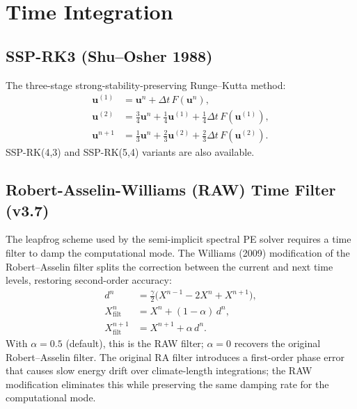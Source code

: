 \documentclass[11pt,a4paper]{article}
\begin{document}
\section{Time Integration}

\subsection{SSP-RK3 (Shu--Osher 1988)}

The three-stage strong-stability-preserving Runge--Kutta method:
\begin{align}
  \bm u^{(1)} &= \bm u^n + \Delta t\,F(\bm u^n), \\
  \bm u^{(2)} &= \tfrac{3}{4}\bm u^n + \tfrac{1}{4}\bm u^{(1)} + \tfrac{1}{4}\Delta t\,F(\bm u^{(1)}), \\
  \bm u^{n+1} &= \tfrac{1}{3}\bm u^n + \tfrac{2}{3}\bm u^{(2)} + \tfrac{2}{3}\Delta t\,F(\bm u^{(2)}).
\end{align}
SSP-RK(4,3) and SSP-RK(5,4) variants are also available.

\subsection{Robert-Asselin-Williams (RAW) Time Filter (v3.7)}

The leapfrog scheme used by the semi-implicit spectral PE solver requires a time filter to damp the computational mode.  The Williams (2009) modification of the Robert--Asselin filter splits the correction between the current and next time levels, restoring second-order accuracy:
\begin{align}
  d^n &= \frac{\gamma}{2}\bigl(X^{n-1}-2X^n+X^{n+1}\bigr), \\
  X^n_{\mathrm{filt}} &= X^n + (1-\alpha)\,d^n, \\
  X^{n+1}_{\mathrm{filt}} &= X^{n+1} + \alpha\,d^n.
\end{align}
With $\alpha=0.5$ (default), this is the RAW filter; $\alpha=0$ recovers the original Robert--Asselin filter.  The original RA filter introduces a first-order phase error that causes slow energy drift over climate-length integrations; the RAW modification eliminates this while preserving the same damping rate for the computational mode.
\end{document}
